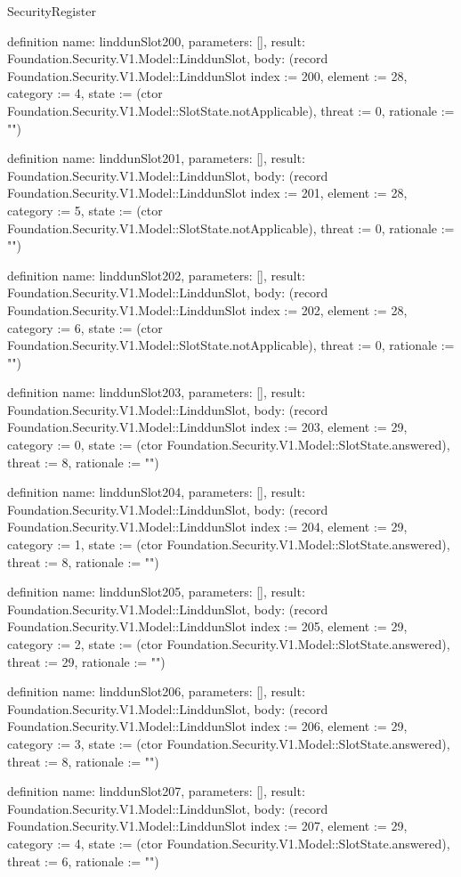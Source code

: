 \begin{lexlean}{SecurityRegister}
\begin{semanticmodule}
definition{
  name: linddunSlot200,
  parameters: [],
  result: Foundation.Security.V1.Model::LinddunSlot,
  body: (record Foundation.Security.V1.Model::LinddunSlot {index := 200, element := 28, category := 4, state := (ctor Foundation.Security.V1.Model::SlotState.notApplicable), threat := 0, rationale := ""})
}

definition{
  name: linddunSlot201,
  parameters: [],
  result: Foundation.Security.V1.Model::LinddunSlot,
  body: (record Foundation.Security.V1.Model::LinddunSlot {index := 201, element := 28, category := 5, state := (ctor Foundation.Security.V1.Model::SlotState.notApplicable), threat := 0, rationale := ""})
}

definition{
  name: linddunSlot202,
  parameters: [],
  result: Foundation.Security.V1.Model::LinddunSlot,
  body: (record Foundation.Security.V1.Model::LinddunSlot {index := 202, element := 28, category := 6, state := (ctor Foundation.Security.V1.Model::SlotState.notApplicable), threat := 0, rationale := ""})
}

definition{
  name: linddunSlot203,
  parameters: [],
  result: Foundation.Security.V1.Model::LinddunSlot,
  body: (record Foundation.Security.V1.Model::LinddunSlot {index := 203, element := 29, category := 0, state := (ctor Foundation.Security.V1.Model::SlotState.answered), threat := 8, rationale := ""})
}

definition{
  name: linddunSlot204,
  parameters: [],
  result: Foundation.Security.V1.Model::LinddunSlot,
  body: (record Foundation.Security.V1.Model::LinddunSlot {index := 204, element := 29, category := 1, state := (ctor Foundation.Security.V1.Model::SlotState.answered), threat := 8, rationale := ""})
}

definition{
  name: linddunSlot205,
  parameters: [],
  result: Foundation.Security.V1.Model::LinddunSlot,
  body: (record Foundation.Security.V1.Model::LinddunSlot {index := 205, element := 29, category := 2, state := (ctor Foundation.Security.V1.Model::SlotState.answered), threat := 29, rationale := ""})
}

definition{
  name: linddunSlot206,
  parameters: [],
  result: Foundation.Security.V1.Model::LinddunSlot,
  body: (record Foundation.Security.V1.Model::LinddunSlot {index := 206, element := 29, category := 3, state := (ctor Foundation.Security.V1.Model::SlotState.answered), threat := 8, rationale := ""})
}

definition{
  name: linddunSlot207,
  parameters: [],
  result: Foundation.Security.V1.Model::LinddunSlot,
  body: (record Foundation.Security.V1.Model::LinddunSlot {index := 207, element := 29, category := 4, state := (ctor Foundation.Security.V1.Model::SlotState.answered), threat := 6, rationale := ""})
}


\end{semanticmodule}
\end{lexlean}
